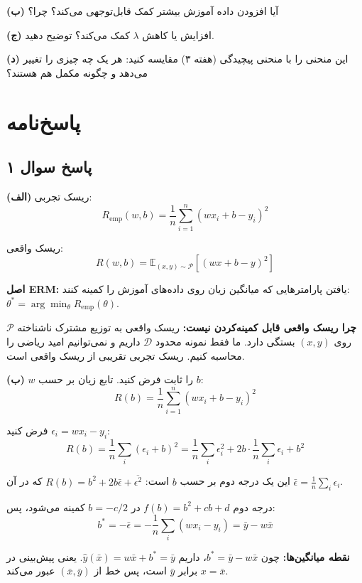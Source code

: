 \documentclass[12pt,a4paper]{article}
\begin{document}
\textbf{(ب)} آیا افزودن داده آموزش بیشتر کمک قابل‌توجهی می‌کند؟ چرا؟

\textbf{(ج)} افزایش یا کاهش $\lambda$ کمک می‌کند؟ توضیح دهید.

\textbf{(د)} این منحنی را با منحنی پیچیدگی (هفته ۳) مقایسه کنید: هر یک چه چیزی را تغییر می‌دهد و چگونه مکمل هم هستند؟

\newpage

\section*{پاسخ‌نامه}

\subsection*{پاسخ سوال ۱}

\textbf{(الف)} ریسک تجربی:
$$R_{\text{emp}}(w, b) = \frac{1}{n}\sum_{i=1}^{n}(wx_i + b - y_i)^2$$

ریسک واقعی:
$$R(w, b) = \mathbb{E}_{(x,y) \sim \mathcal{P}}\left[(wx + b - y)^2\right]$$

\textbf{اصل ERM:} یافتن پارامترهایی که میانگین زیان روی داده‌های آموزش را کمینه کنند: $\theta^* = \arg\min_{\theta} R_{\text{emp}}(\theta)$.

\textbf{چرا ریسک واقعی قابل کمینه‌کردن نیست:} ریسک واقعی به توزیع مشترک ناشناخته $\mathcal{P}$ روی $(x, y)$ بستگی دارد. ما فقط نمونه محدود $\mathcal{D}$ داریم و نمی‌توانیم امید ریاضی را محاسبه کنیم. ریسک تجربی تقریبی از ریسک واقعی است.

\bigskip

\textbf{(ب)} $w$ را ثابت فرض کنید. تابع زیان بر حسب $b$:
$$R(b) = \frac{1}{n}\sum_{i=1}^n (wx_i + b - y_i)^2$$

فرض کنید $\epsilon_i = wx_i - y_i$:
$$R(b) = \frac{1}{n}\sum_i (\epsilon_i + b)^2 = \frac{1}{n}\sum_i \epsilon_i^2 + 2b \cdot \frac{1}{n}\sum_i \epsilon_i + b^2$$

این یک درجه دوم بر حسب $b$ است: $R(b) = b^2 + 2b\bar{\epsilon} + \overline{\epsilon^2}$ که در آن $\bar{\epsilon} = \frac{1}{n}\sum_i \epsilon_i$.

درجه دوم $f(b) = b^2 + cb + d$ در $b = -c/2$ کمینه می‌شود، پس:
$$b^* = -\bar{\epsilon} = -\frac{1}{n}\sum_i (wx_i - y_i) = \bar{y} - w\bar{x}$$

\textbf{نقطه میانگین‌ها:} چون $b^* = \bar{y} - w\bar{x}$، داریم $\hat{y}(\bar{x}) = w\bar{x} + b^* = \bar{y}$. یعنی پیش‌بینی در $x = \bar{x}$ برابر $\bar{y}$ است، پس خط از $(\bar{x}, \bar{y})$ عبور می‌کند.
\end{document}
